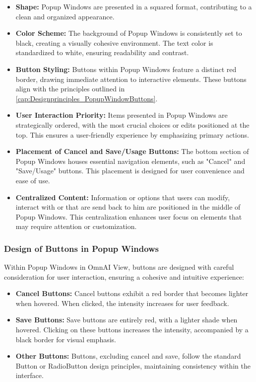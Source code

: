 \documentclass[]{scrreprt}
\begin{document}
\begin{itemize}
    \item \textbf{Shape:} Popup Windows are presented in a squared format, contributing to a clean and organized appearance.
    
    \item \textbf{Color Scheme:} The background of Popup Windows is consistently set to black, creating a visually cohesive environment. The text color is standardized to white, ensuring readability and contrast.
    
    \item \textbf{Button Styling:} Buttons within Popup Windows feature a distinct red border, drawing immediate attention to interactive elements. These buttons align with the principles outlined in \ref{cap:Designprinciples_PopupWindowButtons}.
    
    \item \textbf{User Interaction Priority:} Items presented in Popup Windows are strategically ordered, with the most crucial choices or edits positioned at the top. This ensures a user-friendly experience by emphasizing primary actions.
    
    \item \textbf{Placement of Cancel and Save/Usage Buttons:} The bottom section of Popup Windows houses essential navigation elements, such as "Cancel" and "Save/Usage" buttons. This placement is designed for user convenience and ease of use.
    
    \item \textbf{Centralized Content:} Information or options that users can modify, interact with or that are send back to him are positioned in the middle of Popup Windows. This centralization enhances user focus on elements that may require attention or customization.
\end{itemize}

\subsubsection{Design of Buttons in Popup Windows}

Within Popup Windows in OmnAI View, buttons are designed with careful consideration for user interaction, ensuring a cohesive and intuitive experience:

\begin{itemize}
    \item \textbf{Cancel Buttons:} Cancel buttons exhibit a red border that becomes lighter when hovered. When clicked, the intensity increases for user feedback.
    
    \item \textbf{Save Buttons:} Save buttons are entirely red, with a lighter shade when hovered. Clicking on these buttons increases the intensity, accompanied by a black border for visual emphasis.
    
    \item \textbf{Other Buttons:} Buttons, excluding cancel and save, follow the standard Button or RadioButton design principles, maintaining consistency within the interface.
\end{itemize}
\end{document}
